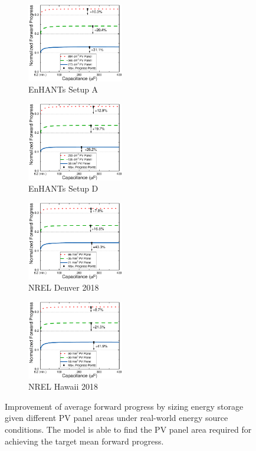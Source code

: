 \begin{figure}[!t]
    \centering
    \begin{subfigure}{0.49\textwidth}
        \centering
        \includegraphics[width=1.66in]{ch4_sizingapproach/figures/HarvStorTgFig1}
        \caption{EnHANTs Setup A}
        \label{fig:harvstor1}
    \end{subfigure}
    \begin{subfigure}{0.49\textwidth}
        \centering
        \includegraphics[width=1.66in]{ch4_sizingapproach/figures/HarvStorTgFig2}
        \caption{EnHANTs Setup D}
        \label{fig:harvstor2}
    \end{subfigure}
    \hfil
    \begin{subfigure}{0.49\textwidth}
        \centering
        \includegraphics[width=1.66in]{ch4_sizingapproach/figures/HarvStorTgFig3}
        \caption{NREL Denver 2018}
        \label{fig:harvstor3}
    \end{subfigure}
    \begin{subfigure}{0.49\textwidth}
        \centering
        \includegraphics[width=1.66in]{ch4_sizingapproach/figures/HarvStorTgFig4}
        \caption{NREL Hawaii 2018}
        \label{fig:harvstor4}
    \end{subfigure}
    \caption{Improvement of average forward progress by sizing energy storage given different PV panel areas under real-world energy source conditions. The model is able to find the PV panel area required for achieving the target mean forward progress. } 
    \label{fig:harvstor}
\end{figure}

